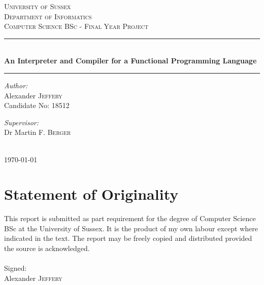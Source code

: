 \documentclass{article}
\begin{document}
\begin{titlepage}
    \center
    \textsc{\LARGE University of Sussex} \\
    \vspace{16mm}
    \textsc{\Large Department of Informatics} \\
    \vspace{4mm}
    \textsc{\large Computer Science BSc - Final Year Project} \\
    \vspace{8mm}
    \rule{\linewidth}{0.5mm}\\
    \vspace{2mm}
    {\huge \bfseries An Interpreter and Compiler for a Functional Programming Language}
    \rule{\linewidth}{0.5mm}
    \begin{minipage}{0.4\textwidth}
        \vspace{10mm}
        \begin{flushleft}
            \emph{Author:} \\
            Alexander \textsc{Jeffery} \\
            Candidate No: \textsc{18512}
        \end{flushleft}
    \end{minipage}
    \begin{minipage}{0.4\textwidth}
        \vspace{10mm}
        \begin{flushright}
            \emph{Supervisor:} \\
            Dr Martin F. \textsc{Berger}
        \end{flushright}
    \end{minipage} \\
    \vspace{10mm}
    {\large \today}
    \vfill
\end{titlepage}

\newpage\mbox{}\newpage

\section*{Statement of Originality}
This report is submitted as part requirement for the degree of Computer Science BSc at the University of Sussex. It is the product of my own labour except where indicated in the text. The report may be freely copied and distributed provided the source is acknowledged.
\\\\
\vspace{20mm}
{\large Signed:}
\\\vspace{20mm}
{\large Alexander \textsc{Jeffery}}
\pagebreak
\end{document}
